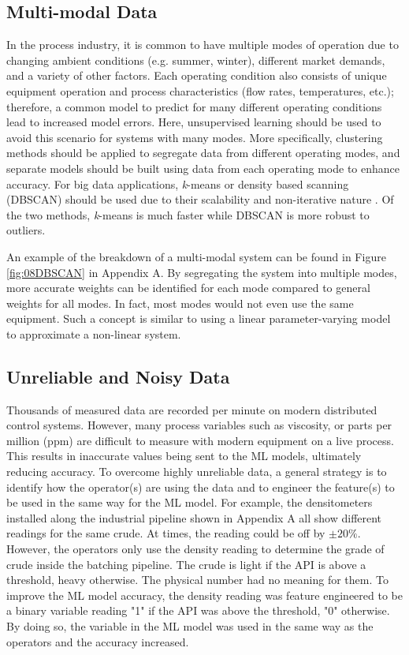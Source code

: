 \subsection{Multi-modal Data}
In the process industry, it is common to have multiple modes of operation due to changing ambient conditions (e.g. summer, winter), different market demands, and a variety of other factors.  Each operating condition also consists of unique equipment operation and process characteristics (flow rates, temperatures, etc.); therefore, a common model to predict for many different operating conditions lead to increased model errors.  Here, unsupervised learning should be used to avoid this scenario for systems with many modes.  More specifically, clustering methods should be applied to segregate data from different operating modes, and separate models should be built using data from each operating mode to enhance accuracy.  For big data applications, \textit{k}-means or density based scanning (DBSCAN) should be used due to their scalability and non-iterative nature \cite{clustering_complexity}. Of the two methods, \textit{k}-means is much faster while DBSCAN is more robust to outliers.

An example of the breakdown of a multi-modal system can be found in Figure \ref{fig:08DBSCAN} in Appendix A.  By segregating the system into multiple modes, more accurate weights can be identified for each mode compared to general weights for all modes.  In fact, most modes would not even use the same equipment.  Such a concept is similar to using a linear parameter-varying model to approximate a non-linear system.  

\subsection{Unreliable and Noisy Data}
Thousands of measured data are recorded per minute on modern distributed control systems. However, many process variables such as viscosity, or parts per million (ppm) are difficult to measure with modern equipment on a live process. This results in inaccurate values being sent to the ML models, ultimately reducing accuracy.  To overcome highly unreliable data, a general strategy is to identify how the operator(s) are using the data and to engineer the feature(s) to be used in the same way for the ML model.  For example, the densitometers installed along the industrial pipeline shown in Appendix A all show different readings for the same crude. At times, the reading could be off by $\pm 20\%$. However, the operators only use the density reading to determine the grade of crude inside the batching pipeline. The crude is light if the API is above a threshold, heavy otherwise.  The physical number had no meaning for them.  To improve the ML model accuracy, the density reading was feature engineered to be a binary variable reading "1" if the API was above the threshold, "0" otherwise.  By doing so, the variable in the ML model was used in the same way as the operators and the accuracy increased.

